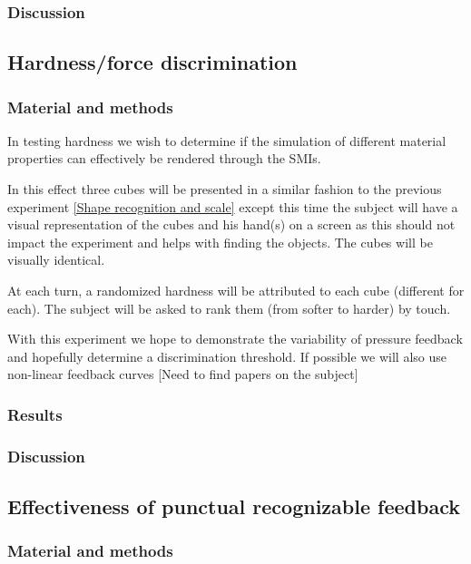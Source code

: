 \documentclass[10pt,journal,compsoc]{IEEEtran}
\begin{document}
\subsubsection{Discussion}

\subsection{Hardness/force discrimination}
\subsubsection{Material and methods}

In testing hardness we wish to determine if the simulation of different material properties can effectively be rendered through the SMIs.

In this effect three cubes will be presented in a similar fashion to the previous experiment \ref{Shape recognition and scale} except this time the subject will have a visual representation of the cubes and his hand(s) on a screen as this should not impact the experiment and helps with finding the objects. The cubes will be visually identical.

At each turn, a randomized hardness will be attributed to each cube (different for each). The subject will be asked to rank them (from softer to harder) by touch.

With this experiment we hope to demonstrate the variability of pressure feedback and hopefully determine a discrimination threshold. If possible we will also use non-linear feedback curves [Need to find papers on the subject]

\subsubsection{Results}
		
\subsubsection{Discussion}

\subsection{Effectiveness of punctual recognizable feedback}
\subsubsection{Material and methods}
\end{document}

